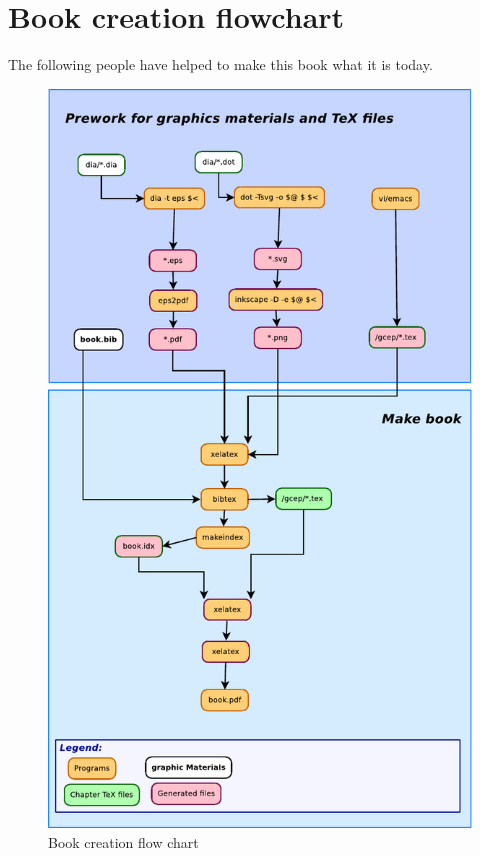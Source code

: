 \section{Book creation flowchart}
The following people have helped to make this book what it is today.

\begin{figure}[H]
\caption{Book creation flow chart}
\label{bookmaking.dia}
\begin{center}
\includegraphics[scale=0.9]{dia/bookmaking.pdf}
\end{center}
\end{figure}

